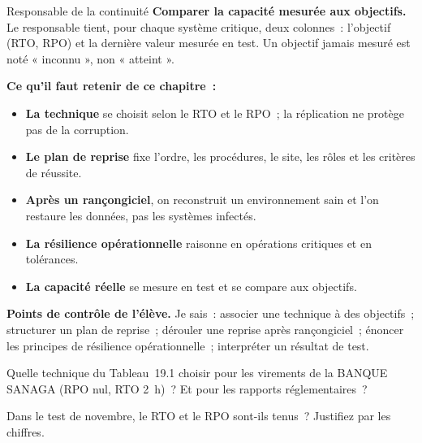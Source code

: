 \begin{boxmetier}{Responsable de la continuité}
\textbf{Comparer la capacité mesurée aux objectifs.} Le responsable tient,
pour chaque système critique, deux colonnes~: l'objectif (RTO, RPO) et la
dernière valeur mesurée en test. Un objectif jamais mesuré est noté
« inconnu », non « atteint ».
\end{boxmetier}

\separateur

\begin{boxresume}
\textbf{Ce qu'il faut retenir de ce chapitre~:}
\begin{itemize}
    \item \textbf{La technique} se choisit selon le RTO et le RPO~; la
          réplication ne protège pas de la corruption.
    \item \textbf{Le plan de reprise} fixe l'ordre, les procédures, le
          site, les rôles et les critères de réussite.
    \item \textbf{Après un rançongiciel}, on reconstruit un environnement
          sain et l'on restaure les données, pas les systèmes infectés.
    \item \textbf{La résilience opérationnelle} raisonne en opérations
          critiques et en tolérances.
    \item \textbf{La capacité réelle} se mesure en test et se compare aux
          objectifs.
\end{itemize}
\end{boxresume}

\begin{boxinfo}
\textbf{Points de contrôle de l'élève.} Je sais~: associer une technique à
des objectifs~; structurer un plan de reprise~; dérouler une reprise après
rançongiciel~; énoncer les principes de résilience opérationnelle~;
interpréter un résultat de test.
\end{boxinfo}

\bigskip

\begin{boxexo}[title={\ding{45}\quad Exercice~19.1. Quelle technique~? \niveaubase}]
Quelle technique du Tableau~19.1 choisir pour les virements de la BANQUE
SANAGA (RPO nul, RTO 2~h)~? Et pour les rapports réglementaires~?
\end{boxexo}

\begin{boxexo}[title={\ding{45}\quad Exercice~19.2. Le test \niveaubase}]
Dans le test de novembre, le RTO et le RPO sont-ils tenus~? Justifiez par
les chiffres.
\end{boxexo}

